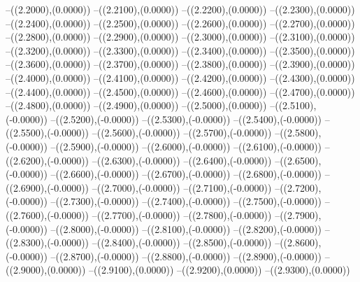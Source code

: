 {	--({\sx*(2.2000)},{\sy*(0.0000)})
	--({\sx*(2.2100)},{\sy*(0.0000)})
	--({\sx*(2.2200)},{\sy*(0.0000)})
	--({\sx*(2.2300)},{\sy*(0.0000)})
	--({\sx*(2.2400)},{\sy*(0.0000)})
	--({\sx*(2.2500)},{\sy*(0.0000)})
	--({\sx*(2.2600)},{\sy*(0.0000)})
	--({\sx*(2.2700)},{\sy*(0.0000)})
	--({\sx*(2.2800)},{\sy*(0.0000)})
	--({\sx*(2.2900)},{\sy*(0.0000)})
	--({\sx*(2.3000)},{\sy*(0.0000)})
	--({\sx*(2.3100)},{\sy*(0.0000)})
	--({\sx*(2.3200)},{\sy*(0.0000)})
	--({\sx*(2.3300)},{\sy*(0.0000)})
	--({\sx*(2.3400)},{\sy*(0.0000)})
	--({\sx*(2.3500)},{\sy*(0.0000)})
	--({\sx*(2.3600)},{\sy*(0.0000)})
	--({\sx*(2.3700)},{\sy*(0.0000)})
	--({\sx*(2.3800)},{\sy*(0.0000)})
	--({\sx*(2.3900)},{\sy*(0.0000)})
	--({\sx*(2.4000)},{\sy*(0.0000)})
	--({\sx*(2.4100)},{\sy*(0.0000)})
	--({\sx*(2.4200)},{\sy*(0.0000)})
	--({\sx*(2.4300)},{\sy*(0.0000)})
	--({\sx*(2.4400)},{\sy*(0.0000)})
	--({\sx*(2.4500)},{\sy*(0.0000)})
	--({\sx*(2.4600)},{\sy*(0.0000)})
	--({\sx*(2.4700)},{\sy*(0.0000)})
	--({\sx*(2.4800)},{\sy*(0.0000)})
	--({\sx*(2.4900)},{\sy*(0.0000)})
	--({\sx*(2.5000)},{\sy*(0.0000)})
	--({\sx*(2.5100)},{\sy*(-0.0000)})
	--({\sx*(2.5200)},{\sy*(-0.0000)})
	--({\sx*(2.5300)},{\sy*(-0.0000)})
	--({\sx*(2.5400)},{\sy*(-0.0000)})
	--({\sx*(2.5500)},{\sy*(-0.0000)})
	--({\sx*(2.5600)},{\sy*(-0.0000)})
	--({\sx*(2.5700)},{\sy*(-0.0000)})
	--({\sx*(2.5800)},{\sy*(-0.0000)})
	--({\sx*(2.5900)},{\sy*(-0.0000)})
	--({\sx*(2.6000)},{\sy*(-0.0000)})
	--({\sx*(2.6100)},{\sy*(-0.0000)})
	--({\sx*(2.6200)},{\sy*(-0.0000)})
	--({\sx*(2.6300)},{\sy*(-0.0000)})
	--({\sx*(2.6400)},{\sy*(-0.0000)})
	--({\sx*(2.6500)},{\sy*(-0.0000)})
	--({\sx*(2.6600)},{\sy*(-0.0000)})
	--({\sx*(2.6700)},{\sy*(-0.0000)})
	--({\sx*(2.6800)},{\sy*(-0.0000)})
	--({\sx*(2.6900)},{\sy*(-0.0000)})
	--({\sx*(2.7000)},{\sy*(-0.0000)})
	--({\sx*(2.7100)},{\sy*(-0.0000)})
	--({\sx*(2.7200)},{\sy*(-0.0000)})
	--({\sx*(2.7300)},{\sy*(-0.0000)})
	--({\sx*(2.7400)},{\sy*(-0.0000)})
	--({\sx*(2.7500)},{\sy*(-0.0000)})
	--({\sx*(2.7600)},{\sy*(-0.0000)})
	--({\sx*(2.7700)},{\sy*(-0.0000)})
	--({\sx*(2.7800)},{\sy*(-0.0000)})
	--({\sx*(2.7900)},{\sy*(-0.0000)})
	--({\sx*(2.8000)},{\sy*(-0.0000)})
	--({\sx*(2.8100)},{\sy*(-0.0000)})
	--({\sx*(2.8200)},{\sy*(-0.0000)})
	--({\sx*(2.8300)},{\sy*(-0.0000)})
	--({\sx*(2.8400)},{\sy*(-0.0000)})
	--({\sx*(2.8500)},{\sy*(-0.0000)})
	--({\sx*(2.8600)},{\sy*(-0.0000)})
	--({\sx*(2.8700)},{\sy*(-0.0000)})
	--({\sx*(2.8800)},{\sy*(-0.0000)})
	--({\sx*(2.8900)},{\sy*(-0.0000)})
	--({\sx*(2.9000)},{\sy*(0.0000)})
	--({\sx*(2.9100)},{\sy*(0.0000)})
	--({\sx*(2.9200)},{\sy*(0.0000)})
	--({\sx*(2.9300)},{\sy*(0.0000)})
}
